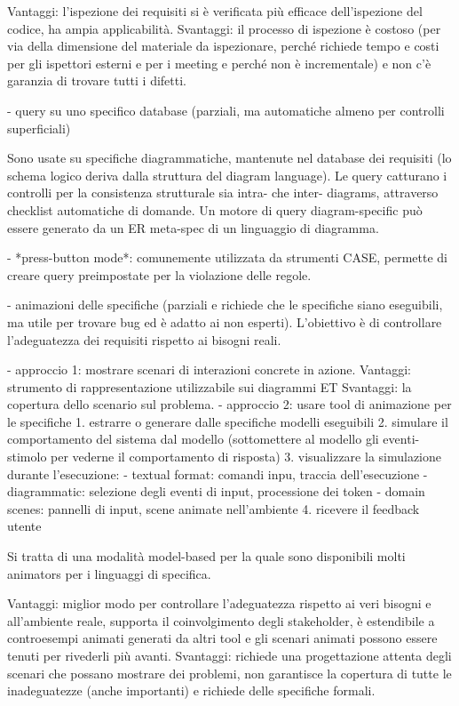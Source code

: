  Vantaggi: l’ispezione dei requisiti si è verificata più efficace dell’ispezione del codice, ha ampia applicabilità.
 Svantaggi: il processo di ispezione è costoso (per via della dimensione del materiale da ispezionare, perché richiede tempo e costi per gli ispettori esterni e per i meeting e perché non è incrementale) e non c’è garanzia di trovare tutti i difetti.

- query su uno specifico database (parziali, ma automatiche almeno per controlli superficiali)
 
 Sono usate su specifiche diagrammatiche, mantenute nel database dei requisiti (lo schema logico deriva dalla struttura del diagram language).
 Le query catturano i controlli per la consistenza strutturale sia intra- che inter- diagrams, attraverso checklist automatiche di domande.
 Un motore di query diagram-specific può essere generato da un ER meta-spec di un linguaggio di diagramma.
 
 
 - *press-button mode*: comunemente utilizzata da strumenti CASE, permette di creare query preimpostate per la violazione delle regole. 

- animazioni delle specifiche (parziali e richiede che le specifiche siano eseguibili, ma utile per trovare bug ed è adatto ai non esperti).
 L’obiettivo è di controllare l’adeguatezza dei requisiti rispetto ai bisogni reali.
 
 - approccio 1: mostrare scenari di interazioni concrete in azione.
   Vantaggi: strumento di rappresentazione utilizzabile sui diagrammi ET
   Svantaggi: la copertura dello scenario sul problema.
 - approccio 2: usare tool di animazione per le specifiche
   1. estrarre o generare dalle specifiche modelli eseguibili 
   2. simulare il comportamento del sistema dal modello (sottomettere al modello gli eventi-stimolo per vederne il comportamento di risposta)
   3. visualizzare la simulazione durante l’esecuzione:
      - textual format: comandi inpu, traccia dell’esecuzione
      - diagrammatic: selezione degli eventi di input, processione dei token
      - domain scenes: pannelli di input, scene animate nell’ambiente
   4. ricevere il feedback utente
 
 Si tratta di una modalità model-based per la quale sono disponibili molti animators per i linguaggi di specifica.
 
 Vantaggi: miglior modo per controllare l’adeguatezza rispetto ai veri bisogni e all’ambiente reale, supporta il coinvolgimento degli stakeholder, è estendibile a controesempi animati generati da altri tool e gli scenari animati possono essere tenuti per rivederli più avanti.
 Svantaggi: richiede una progettazione attenta degli scenari che possano mostrare dei problemi, non garantisce la copertura di tutte le inadeguatezze (anche importanti) e richiede delle specifiche formali.

